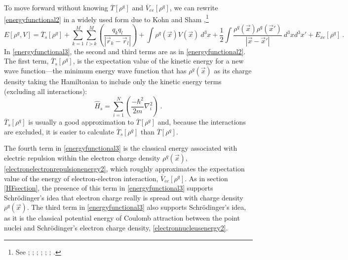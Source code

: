 \documentclass[12pt,onecolumn,secnumarabic,amsmath,amssymb,balancelastpage,nofootinbib]{article}
\begin{document}
To move forward without knowing $\overline{T}[\rho^q]$ and $\overline{V}_{ee}[\rho^q]$, we can rewrite \eqref{energyfunctional2} in a widely used form due to Kohn and Sham \cite{kohn1965},\footnote{See \cite[eq.\ 7.1.1 \& 7.1.13]{parryang}; \cite[eq.\ 3.14]{baerends1997}; \cite[eq.\ 5.11]{koch2001}; \cite[eq.\ 7.5]{martin2004}; \cite[pg.\ 320]{atkins2011}; \cite[eq.\ 18]{becke2014}; \cite[eq.\ 16.44]{levineQC}.}
\begin{equation}
E[\rho^q,V]=\overline{T}_s[\rho^q]+\sum_{k=1}^{M}\sum_{l>k}^{M} \left(\frac{q_k q_l}{|\vec{r}_k-\vec{r}_l|}\right)+\int{\rho^q(\vec{x}) V(\vec{x}) \  d^3 x}+\frac{1}{2}\int{\frac{\rho^q(\vec{x}) \rho^q(\vec{x}')}{|\vec{x}-\vec{x}'|}\  d^3 x d^3 x'}+E_{xc}[\rho^q]
\ .
\label{energyfunctional3}
\end{equation}
In \eqref{energyfunctional3}, the second and third terms are as in \eqref{energyfunctional2}.  The first term, $\overline{T}_s[\rho^q]$, is the expectation value of the kinetic energy for a new wave function---the minimum energy wave function that has $\rho^q(\vec{x})$ as its charge density taking the Hamiltonian to include only the kinetic energy terms (excluding all interactions):
\begin{equation}
\widehat{H}_s= \sum_{i=1}^{N}\left(\frac{-\hbar^2}{2 m} \nabla_i^2 \right)
\ .
\label{hamiltonianK}
\end{equation}
$\overline{T}_s[\rho^q]$ is usually a good approximation to $\overline{T}[\rho^q]$ and, because the interactions are excluded, it is easier to calculate $\overline{T}_s[\rho^q]$ than $\overline{T}[\rho^q]$.

The fourth term in \eqref{energyfunctional3} is the classical energy associated with electric repulsion within the electron charge density $\rho^q(\vec{x})$, \eqref{electronelectronrepulsionenergy2}, which roughly approximates the expectation value of the energy of electron-electron interaction, $\overline{V}_{ee}[\rho^q]$.  As in section \ref{HFsection}, the presence of this term in \eqref{energyfunctional3} supports Schr\"{o}dinger's idea that electron charge really is spread out with charge density $\rho^q(\vec{x})$.  The third term in \eqref{energyfunctional3} also supports Schr\"{o}dinger's idea, as it is the classical potential energy of Coulomb attraction between the point nuclei and Schr\"{o}dinger's electron charge density, \eqref{electronnucleusenergy2}.
\end{document}
